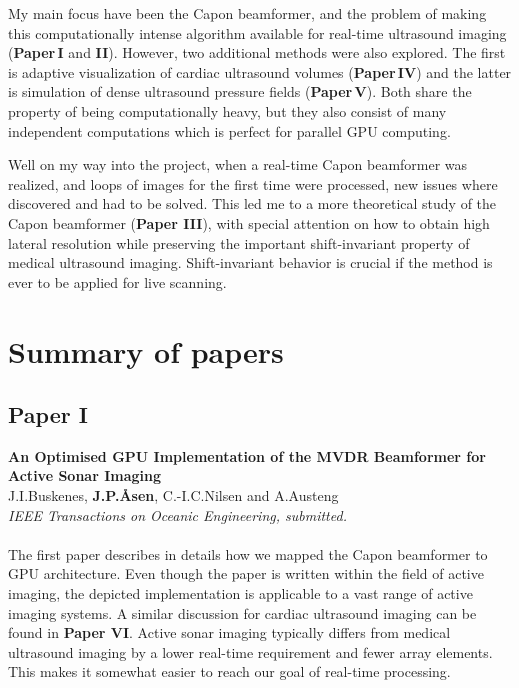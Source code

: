 My main focus have been the Capon beamformer, and the problem of making this computationally intense algorithm available for real-time ultrasound imaging (\textbf{Paper\,I} and \textbf{II}). However, two additional methods were also explored. The first is adaptive visualization of cardiac ultrasound volumes (\textbf{Paper\,IV}) and the latter is simulation of dense ultrasound pressure fields (\textbf{Paper\,V}). Both share the property of being computationally heavy, but they also consist of many independent computations which is perfect for parallel GPU computing. 

Well on my way into the project, when a real-time Capon beamformer was realized, and loops of images for the first time were processed, new issues where discovered and had to be solved. This led me to a more theoretical study of the Capon beamformer (\textbf{Paper III}), with special attention on how to obtain high lateral resolution while preserving the important shift-invariant property of medical ultrasound imaging. Shift-invariant behavior is crucial if the method is ever to be applied for live scanning. 



\section{Summary of papers}

\subsection{Paper I}
\textbf{An Optimised GPU Implementation of the MVDR Beamformer for Active Sonar Imaging}\\
J.\:I.\:Buskenes, \textbf{J.\:P.\:\AA{}sen}, C.-I.\:C.\:Nilsen and A.\:Austeng\\
{\it IEEE Transactions on Oceanic Engineering, submitted.}\\\\
The first paper describes in details how we mapped the Capon beamformer to GPU architecture. Even though the paper is written within the field of active  imaging, the depicted implementation is applicable to a vast range of active imaging systems. A similar discussion for cardiac ultrasound imaging can be found in \textbf{Paper VI}.  Active sonar imaging typically differs from medical ultrasound imaging by a lower real-time requirement and fewer array elements. This makes it somewhat easier to reach our goal of real-time processing. 

